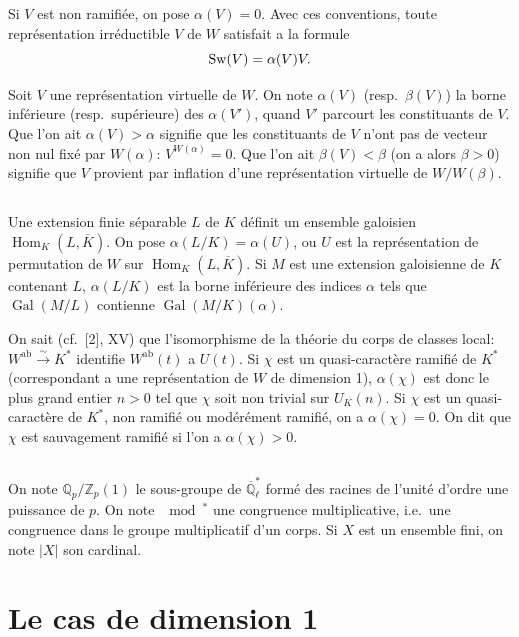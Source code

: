 \documentclass[12pt,a4paper]{article}
\theoremstyle{plain}
\theoremstyle{definition}
\theoremstyle{remark}
\DeclareMathOperator{\Hom}{Hom}
\DeclareMathOperator{\sw}{Sw}
\newcommand{\bQ}{\mathbb{Q}}
\newcommand{\bZ}{\mathbb{Z}}
\let\dim\relax\let\det\relax
\providecommand{\Hom}{\operatorname{Hom}}
\providecommand{\Gal}{\operatorname{Gal}}
\begin{document}
Si $V$ est non ramifi\'ee, on pose $\alpha(V) = 0$. Avec ces conventions, toute repr\'esentation irr\'eductible $V$ de $W$ satisfait a la formule
\[
\sw(V) = \alpha(V) \dim V.
\]

Soit $V$ une repr\'esentation virtuelle de $W$. On note $\alpha(V)$ (resp.~$\beta(V)$) la borne inf\'erieure (resp.~sup\'erieure) des $\alpha(V')$, quand $V'$ parcourt les constituants de $V$. Que l'on ait $\alpha(V) > \alpha$ signifie que les constituants de $V$ n'ont pas de vecteur non nul fix\'e par $W(\alpha)$: $V^{W(\alpha)} = 0$. Que l'on ait $\beta(V) < \beta$ (on a alors $\beta > 0$) signifie que $V$ provient par inflation d'une repr\'esentation virtuelle de $W/W(\beta)$.

\subsection{}
\label{sec:0.7}

Une extension finie s\'eparable $L$ de $K$ d\'efinit un ensemble galoisien $\Hom_K(L, \overline{K})$. On pose $\alpha(L/K) = \alpha(U)$, ou $U$ est la repr\'esentation de permutation de $W$ sur $\Hom_K(L, \overline{K})$. Si $M$ est une extension galoisienne de $K$ contenant $L$, $\alpha(L/K)$ est la borne inf\'erieure des indices $\alpha$ tels que $\Gal(M/L)$ contienne $\Gal(M/K)(\alpha)$.

On sait (cf.~[2], XV) que l'isomorphisme de la th\'eorie du corps de classes local: $W^{\text{ab}} \xrightarrow{\sim} K^*$ identifie $W^{\text{ab}}(t)$ a $U(t)$. Si $\chi$ est un quasi-caract\`ere ramifi\'e de $K^*$ (correspondant a une repr\'esentation de $W$ de dimension 1), $\alpha(\chi)$ est donc le plus grand entier $n > 0$ tel que $\chi$ soit non trivial sur $U_K(n)$. Si $\chi$ est un quasi-caract\`ere de $K^*$, non ramifi\'e ou mod\'er\'ement ramifi\'e, on a $\alpha(\chi) = 0$. On dit que $\chi$ est sauvagement ramifi\'e si l'on a $\alpha(\chi) > 0$.

\subsection{}
\label{sec:0.8}

On note $\bQ_p/\bZ_p(1)$ le sous-groupe de $\overline{\bQ}_\ell^*$ form\'e des racines de l'unit\'e d'ordre une puissance de $p$. On note $\mod^*$ une congruence multiplicative, i.e.~une congruence dans le groupe multiplicatif d'un corps. Si $X$ est un ensemble fini, on note $|X|$ son cardinal.


\section{Le cas de dimension 1}
\label{sec:1}
\setcounter{equation}{0}
\end{document}

